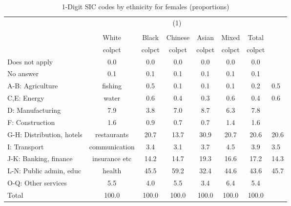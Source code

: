 \begin{table}[htbp]\centering
\def\sym#1{\ifmmode^{#1}\else\(^{#1}\)\fi}
\caption{1-Digit SIC codes by ethnicity for females (proportions)}
\begin{tabular}{l*{6}{c}}
\hline\hline
          &                                    \\
          &                                       \\
          &    White&    Black&  Chinese&    Asian&    Mixed&    Total\\
          &   colpct&   colpct&   colpct&   colpct&   colpct&   colpct\\
\hline
Does not apply&      0.0&      0.0&      0.0&      0.0&      0.0&      0.0\\
No answer &      0.1&      0.1&      0.1&      0.1&      0.1&      0.1\\
A-B: Agriculture & fishing&      0.5&      0.1&      0.1&      0.1&      0.2&      0.5\\
C,E: Energy & water&      0.6&      0.4&      0.3&      0.6&      0.4&      0.6\\
D: Manufacturing&      7.9&      3.8&      7.0&      8.7&      6.3&      7.8\\
F: Construction&      1.6&      0.9&      0.7&      0.7&      1.4&      1.6\\
G-H: Distribution, hotels & restaurants&     20.7&     13.7&     30.9&     20.7&     20.6&     20.6\\
I: Transport & communication&      3.4&      3.1&      3.7&      4.5&      3.9&      3.5\\
J-K: Banking, finance & insurance etc&     14.2&     14.7&     19.3&     16.6&     17.2&     14.3\\
L-N: Public admin, educ & health&     45.5&     59.2&     32.4&     44.6&     43.6&     45.7\\
O-Q: Other services&      5.5&      4.0&      5.5&      3.4&      6.4&      5.4\\
Total     &    100.0&    100.0&    100.0&    100.0&    100.0&    100.0\\
\hline\hline
\end{tabular}
\end{table}
